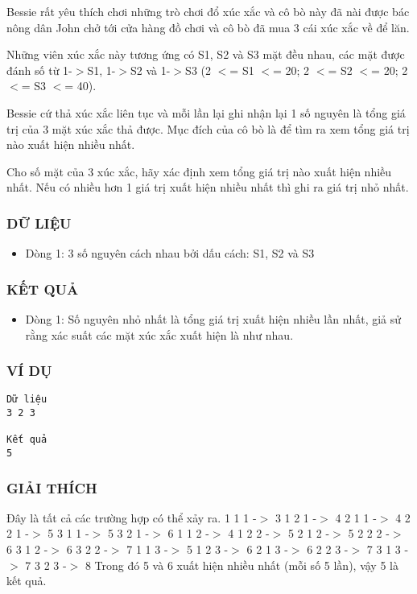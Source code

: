 



   Bessie rất yêu thích chơi những trò chơi đổ xúc xắc và cô bò này đã nài được bác nông dân John chở tới cửa hàng đồ chơi và cô bò đã mua 3 cái xúc xắc về để lăn.  

   Những viên xúc xắc này tương ứng có S1, S2 và S3 mặt đều nhau, các mặt được đánh  số từ 1-$>$S1, 1-$>$S2 và 1-$>$S3 (2 $<$= S1 $<$= 20; 2 $<$= S2 $<$= 20; 2 $<$= S3 $<$= 40).  

   Bessie cứ thả xúc xắc liên tục và mỗi lần lại ghi nhận lại 1 số nguyên là tổng giá trị  của 3 mặt xúc xắc thả được. Mục đích của cô bò là để tìm ra xem tổng giá trị nào  xuất hiện nhiều nhất.  

   Cho số mặt của 3 xúc xắc, hãy xác định xem tổng giá trị nào xuất hiện nhiều nhất. Nếu có nhiều hơn 1 giá trị xuất hiện nhiều nhất thì ghi ra giá trị nhỏ nhất.  

\subsubsection{   DỮ LIỆU  }
\begin{itemize}
	\item     Dòng 1: 3 số nguyên cách nhau bởi dấu cách: S1, S2 và S3   
\end{itemize}

\subsubsection{   KẾT QUẢ  }
\begin{itemize}
	\item     Dòng 1: Số nguyên nhỏ nhất là tổng giá trị xuất hiện nhiều lần nhất, giả sử rằng         xác suất các mặt xúc xắc xuất hiện là như nhau.   
\end{itemize}

\subsubsection{   VÍ DỤ  }
\begin{verbatim}
Dữ liệu
3 2 3

Kết quả
5
\end{verbatim}

\subsubsection{   GIẢI THÍCH  }

   Đây là tất cả các trường hợp có thể xảy ra. 1 1 1 -$>$ 3  1 2 1 -$>$ 4  2 1 1 -$>$ 4  2 2 1 -$>$ 5  3 1 1 -$>$ 5  3 2 1 -$>$ 6 1 1 2 -$>$ 4  1 2 2 -$>$ 5  2 1 2 -$>$ 5  2 2 2 -$>$ 6  3 1 2 -$>$ 6  3 2 2 -$>$ 7 1 1 3 -$>$ 5  1 2 3 -$>$ 6  2 1 3 -$>$ 6  2 2 3 -$>$ 7  3 1 3 -$>$ 7  3 2 3 -$>$ 8 Trong đó 5 và 6 xuất hiện nhiều nhất (mỗi số 5 lần), vậy 5 là kết quả.  